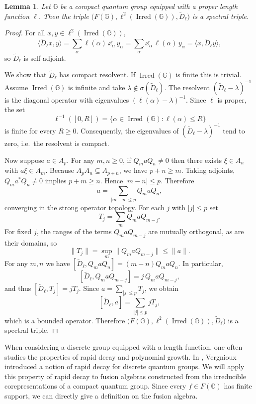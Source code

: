 \documentclass[12pt, reqno]{amsart}
\newtheorem{lemma}[theorem]{Lemma}
\theoremstyle{definition}
\theoremstyle{remark}
\numberwithin{equation}{section}
\begin{document}
\begin{lemma}
Let $\mathbb{G}$ be a compact quantum group equipped with a proper 
length function $\ell$. Then the triple 
$\bigl(F(\mathbb{G}), \ell^2(\operatorname{Irred}(\mathbb{G})), 
\tilde{D}_\ell\bigr)$ is a spectral triple.
\end{lemma}
\begin{proof}
For all $x, y \in \ell^2(\operatorname{Irred}(\mathbb{G}))$,
\[
\langle \tilde{D}_\ell x, y \rangle 
= \sum_{\alpha} \overline{\ell(\alpha)}\,\overline{x_\alpha}\,y_\alpha
= \sum_{\alpha} \overline{x_\alpha}\,\ell(\alpha)\,y_\alpha 
= \langle x, \tilde{D}_\ell y \rangle,
\]
so $\tilde{D}_\ell$ is self‑adjoint.

We show that $\tilde{D}_\ell$ has compact resolvent. If 
$\operatorname{Irred}(\mathbb{G})$ is finite this is trivial. Assume 
$\operatorname{Irred}(\mathbb{G})$ is infinite and take 
$\lambda \notin \sigma(\tilde{D}_\ell)$. The resolvent 
$(\tilde{D}_\ell - \lambda)^{-1}$ is the diagonal operator with 
eigenvalues $(\ell(\alpha) - \lambda)^{-1}$. Since $\ell$ is proper, 
the set
\[
\ell^{-1}([0,R]) = \{\alpha \in \operatorname{Irred}(\mathbb{G}) : 
\ell(\alpha) \le R\}
\]
is finite for every $R \ge 0$. Consequently, the eigenvalues of 
$(\tilde{D}_\ell - \lambda)^{-1}$ tend to zero, i.e.\ the resolvent 
is compact.

Now suppose $a \in A_p$. For any $m, n \ge 0$, if 
$Q_m a Q_n \neq 0$ then there exists $\xi \in A_n$ with 
$a\xi \in A_m$. Because $A_p A_n \subseteq A_{p+n}$, we have 
$p+n \ge m$. Taking adjoints, $Q_m a^* Q_n \neq 0$ implies 
$p+m \ge n$. Hence $|m-n| \le p$. Therefore
\[
a = \sum_{|m-n| \le p} Q_m a Q_n,
\]
converging in the strong operator topology. For each $j$ with 
$|j| \le p$ set
\[
T_j = \sum_m Q_m a Q_{m-j}.
\]
For fixed $j$, the ranges of the terms $Q_m a Q_{m-j}$ are mutually 
orthogonal, as are their domains, so
\[
\|T_j\| = \sup_m \|Q_m a Q_{m-j}\| \le \|a\|.
\]
For any $m, n$ we have 
$[\tilde{D}_\ell, Q_m a Q_n] = (m-n)Q_m a Q_n$. In particular,
\[
[\tilde{D}_\ell, Q_m a Q_{m-j}] = j\, Q_m a Q_{m-j},
\]
and thus $[\tilde{D}_\ell, T_j] = j T_j$. Since 
$a = \sum_{|j|\le p} T_j$, we obtain
\[
[\tilde{D}_\ell, a] = \sum_{|j|\le p} j T_j,
\]
which is a bounded operator. Therefore 
$\bigl(F(\mathbb{G}), \ell^2(\operatorname{Irred}(\mathbb{G})), 
\tilde{D}_\ell\bigr)$ is a spectral triple.
\end{proof}
When considering a discrete group equipped with a length function, one often studies the properties of rapid decay and polynomial growth. In \cite{20}, Vergnioux introduced a notion of rapid decay for discrete quantum groups. We will apply this property of rapid decay to fusion algebras constructed from the irreducible corepresentations of a compact quantum group. Since every $f \in F(\mathbb{G})$ has finite support, we can directly give a definition on the fusion algebra.
\end{document}

